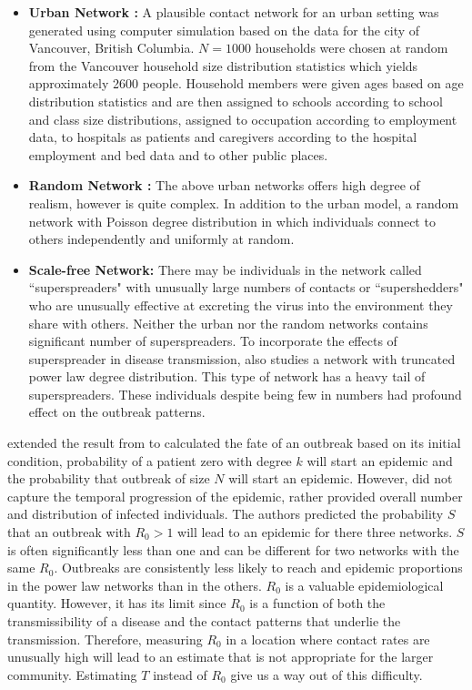 \documentclass[12pt, journal,onecolumn]{IEEEtran}
\begin{document}
\begin{itemize}
\item \textbf{Urban Network : }  A plausible contact network for an urban setting was generated using computer simulation based on the data for the city of Vancouver, British Columbia. $N=1000$ households were chosen at random from the Vancouver household size distribution statistics which yields approximately 2600 people. Household members were given ages based on age distribution statistics and are then assigned to schools according to school and class size distributions, assigned to occupation according to employment data, to hospitals as patients and caregivers according to the hospital employment and bed data and to other public places.
\item \textbf{Random Network : } The above urban networks offers high degree of realism, however is quite complex. In addition to the urban model, a random network with Poisson degree distribution in which individuals connect to others independently and uniformly at random.
\item \textbf{Scale-free Network: } There may be individuals in the network called ``superspreaders" with unusually large numbers of contacts or ``supershedders" who are unusually effective at excreting the virus into the environment they share with others. Neither the urban nor the random networks contains significant number of superspreaders. To incorporate the effects of superspreader in disease transmission, \citep{meyers2005network} also studies a network with truncated power law degree distribution. This type of network has a heavy tail of superspreaders. These individuals despite being few in numbers had profound effect on the outbreak patterns.
\end{itemize}

 \citep{meyers2005network} extended the result from \citep{newman2002spread} to calculated the fate of an outbreak based on its initial condition, probability of a patient zero with degree $k$ will start an epidemic and the probability that outbreak of size $N$ will start an epidemic. However, \citep{newman2002spread} did not capture the temporal progression of the epidemic, rather provided overall number and distribution of infected individuals. The authors predicted the probability $S$ that an outbreak with $R_0>1$ will lead to an epidemic for there three networks. $S$ is often significantly less than one and can be different for two networks with the same $R_0$. Outbreaks are consistently less likely to reach and epidemic proportions in the power law networks than in the others. $R_0$ is a valuable epidemiological quantity. However, it has its limit since $R_0$ is a function of both the transmissibility of a disease and the contact patterns that underlie the transmission. Therefore, measuring $R_0$ in a location where contact rates are unusually high will lead to an estimate that is not appropriate for the larger community.  Estimating $T$ instead of $R_0$ give us a way out of this difficulty.
\end{document}
